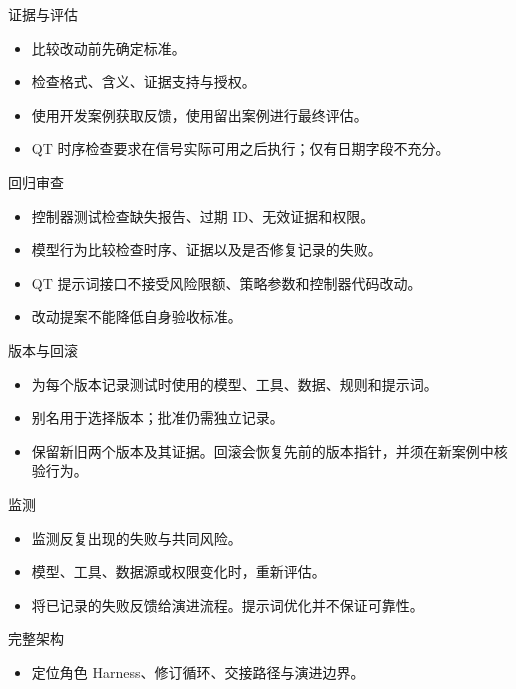 \begin{frame}{证据与评估}
\begin{center}\resizebox{.90\textwidth}{!}{}\end{center}
\begin{itemize}
\item 比较改动前先确定标准。
\item 检查格式、含义、证据支持与授权。
\item 使用开发案例获取反馈，使用留出案例进行最终评估。
\item QT 时序检查要求在信号实际可用之后执行；仅有日期字段不充分。
\end{itemize}
\end{frame}
\begin{frame}{回归审查}
\begin{itemize}
\item 控制器测试检查缺失报告、过期 ID、无效证据和权限。
\item 模型行为比较检查时序、证据以及是否修复记录的失败。
\item QT 提示词接口不接受风险限额、策略参数和控制器代码改动。
\item 改动提案不能降低自身验收标准。
\end{itemize}
\end{frame}
\begin{frame}{版本与回滚}
\begin{center}
\resizebox{.94\textwidth}{!}{}
\end{center}
\begin{itemize}
\item 为每个版本记录测试时使用的模型、工具、数据、规则和提示词。
\item 别名用于选择版本；批准仍需独立记录。
\item 保留新旧两个版本及其证据。回滚会恢复先前的版本指针，并须在新案例中核验行为。
\end{itemize}
\end{frame}
\begin{frame}{监测}
\begin{center}
\resizebox{.94\textwidth}{!}{}
\end{center}
\begin{itemize}
\item 监测反复出现的失败与共同风险。
\item 模型、工具、数据源或权限变化时，重新评估。
\item 将已记录的失败反馈给演进流程。提示词优化并不保证可靠性。
\end{itemize}
\end{frame}
\begin{frame}[t]{完整架构}
\setlength{\topsep}{0pt}
\begin{center}\resizebox{!}{6.0cm}{}\end{center}
\begin{itemize}
\item 定位角色 Harness、修订循环、交接路径与演进边界。
\end{itemize}
\end{frame}
